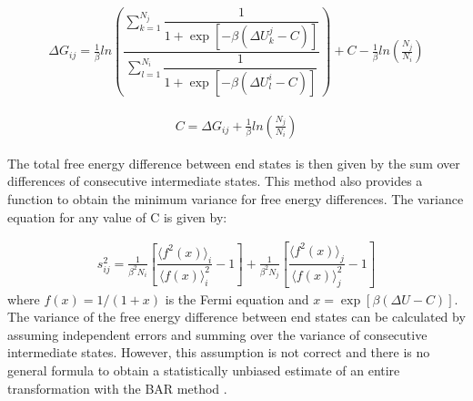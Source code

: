 \begin{equation}
\label{eq:bar1}
\begin{aligned}
\Delta G_{ij} = \frac{1}{\beta} ln \left( \dfrac{\sum_{k=1}^{N_{j}} \dfrac{1}{1+\exp[-\beta(\Delta U_{k}^{j}-C)]}}{\sum_{l=1}^{N_{i}} \dfrac{1}{1+\exp[-\beta(\Delta U_{l}^{i}-C)]}}\right) + C - \frac{1}{\beta}ln\left(\frac{N_{j}}{N_{i}}\right)
\end{aligned}
\end{equation}

\begin{equation}
\label{eq:bar2}
\begin{aligned}
C = \Delta G_{ij} + \frac{1}{\beta}ln\left(\frac{N_{j}}{N_{i}}\right)
\end{aligned}
\end{equation}

The total free energy difference between end states is then given by the sum over differences of consecutive intermediate states. This method also provides a function to obtain the minimum variance for free energy differences. The variance equation for any value of C is given by:

\begin{equation}
\label{eq:barvar}
\begin{aligned}
s_{ij}^{2} = \frac{1}{\beta^{2} N_{i}} \left[\dfrac{\langle{f^{2}(x)}\rangle_{i}}{\langle{f(x)}\rangle^{2}_{i}} - 1\right] + \frac{1}{\beta^{2} N_{j}} \left[\dfrac{\langle{f^{2}(x)}\rangle_{j}}{\langle{f(x)}\rangle^{2}_{j}} - 1\right]
\end{aligned}
\end{equation}
where $f(x)=1/(1+x)$ is the Fermi equation and $x=\exp[\beta(\Delta U - C)]$. The variance of the free energy difference between end states can be calculated by assuming independent errors and summing over the variance of consecutive intermediate states. However, this assumption is not correct and there is no general formula to obtain a statistically unbiased estimate of an entire transformation with the BAR method \cite{bareva}. 


